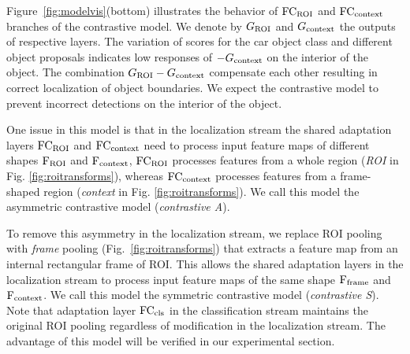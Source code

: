 Figure~\ref{fig:modelvis}(bottom) illustrates the behavior of ${\rm FC_{ROI}}$ and ${\rm FC_{context}}$
branches of the contrastive model. We denote by $G_{\rm ROI}$ and $G_{\rm context}$ the outputs of respective layers. The variation of scores for the car object
class and different object proposals indicates low responses of $-G_{\rm context}$
on the interior of the object. The combination $G_{\rm ROI}-G_{\rm context}$ compensate each other
resulting in correct localization of object boundaries. We expect the
contrastive model to prevent incorrect detections on the interior of the object.

One issue in this model is that in the localization stream the shared adaptation layers ${\rm FC_{ROI}}$ and ${\rm FC_{context}}$ need to process input feature maps of different shapes ${\rm F_{ROI}}$ and ${\rm F_{context}}$, \ie  ${\rm FC_{ROI}}$ processes features from a whole region ({\em ROI} in Fig. \ref{fig:roitransforms}), whereas ${\rm FC_{context}}$ processes features from a frame-shaped region ({\em context} in Fig. \ref{fig:roitransforms}). We call this model the asymmetric contrastive model ({\em contrastive A}).  

To remove this asymmetry in the localization stream, we replace ROI pooling with {\em frame} pooling (Fig.~\ref{fig:roitransforms}) that extracts a feature map from an internal rectangular frame of ROI. This allows the shared adaptation layers in the localization stream to process input feature maps of the same shape ${\rm F_{frame}}$ and ${\rm F_{context}}$. We call this model the symmetric contrastive model ({\em contrastive S}). Note that adaptation layer ${\rm
FC_{cls}}$ in the classification stream maintains the original ROI pooling 
regardless of modification in the localization stream. The advantage of this
model will be verified in our experimental section.  

